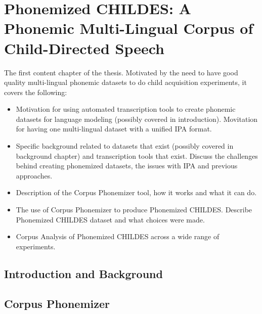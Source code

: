 \chapter{Phonemized CHILDES: A Phonemic Multi-Lingual Corpus of Child-Directed Speech}

\begin{roughdraft}
    The first content chapter of the thesis. Motivated by the need to have good quality multi-lingual phonemic datasets to do child acquisition experiments, it covers the following:
    \begin{itemize}[label=--]
        \item Motivation for using automated transcription tools to create phonemic datasets for language modeling (possibly covered in introduction). Movitation for having one multi-lingual dataset with a unified IPA format.
        \item Specific background related to datasets that exist (possibly covered in background chapter) and transcription tools that exist. Discuss the challenges behind creating phonemized datasets, the issues with IPA and previous approaches.
        \item Description of the Corpus Phonemizer tool, how it works and what it can do.
        \item The use of Corpus Phonemizer to produce Phonemized CHILDES. Describe Phonemized CHILDES dataset and what choices were made. 
        \item Corpus Analysis of Phonemized CHILDES across a wide range of experiments. 
    \end{itemize}
\end{roughdraft}

\section{Introduction and Background}
\label{sec:dataset-intro}


\section{Corpus Phonemizer}
\label{sec:dataset-corpus-phonemizer}





